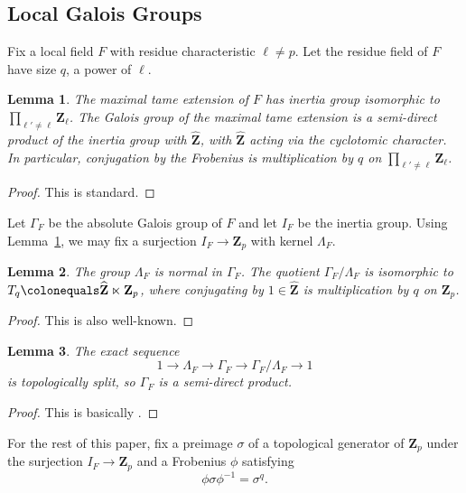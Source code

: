 \documentclass[11pt, letterpaper,english]{amsart}
\theoremstyle{plain}
\newtheorem{lem}{Lemma}
\newtheorem{lemma}[lem]{Lemma}
\theoremstyle{definition}
\numberwithin{equation}{section}
\numberwithin{lem}{section}
\newcommand{\mathfont}{\mathbf}
\newcommand{\Z}{\mathfont Z}
\newcommand{\ZZ}{\mathfont Z}
\newcommand{\Zhat}{\widehat{\ZZ}}
\newcommand{\Zp}{\mathfont{Z}_p}
\newcommand{\Ld}{\Lambda}
\begin{document}
\subsection{Local Galois Groups} \label{ss:galois}

Fix a local field $F$ with residue characteristic $\ell \neq p$.
Let the residue field of $F$ have size $q$, a power of $\ell$.

\begin{lemma} \label{lem:tamestructure}
The maximal tame extension of $F$ has inertia group isomorphic to $\prod_{\ell' \neq \ell} \ZZ_{\ell}$.
The Galois group of the maximal tame extension is a semi-direct product of the inertia group with $\Zhat$, with $\Zhat$ acting via the cyclotomic character.  In particular, conjugation by the Frobenius is multiplication by $q$ on $\prod_{\ell' \neq \ell} \ZZ_{\ell}$.
\end{lemma}

\begin{proof}
This is standard.  
\end{proof}

Let $\Gamma_F$ be the absolute Galois group of $F$ and let $I_F$ be the inertia group.  Using Lemma~\ref{lem:tamestructure}, we may fix a surjection $I_F \to \ZZ_p$ with kernel $\Lambda_F$.

\begin{lem} \label{lem:tq}
The group $\Lambda_F$ is normal in $\Gamma_F$.  The quotient $\Gamma_F / \Lambda_F$ is isomorphic to $T_q \colonequals \Zhat \ltimes \Z_p$, where conjugating by $1 \in \Zhat$ is multiplication by $q$ on $\Zp$.
\end{lem}

\begin{proof}
This is also well-known.
\end{proof}

\begin{lemma} \label{lem:semidirect prod}
The exact sequence
\[
1 \to \Ld_F \to \Gamma_F \to \Gamma_F / \Lambda_F \to 1
\]
is topologically split, so $\Gamma_F$ is a semi-direct product.
\end{lemma}

\begin{proof}
This is basically \cite[2.4.10]{cht08}. 
\end{proof}

For the rest of this paper, fix a preimage $\sigma$ of a topological generator of $\Z_p$ under the surjection $I_F \to \Z_p$ and a Frobenius $\phi$ satisfying  
\[ \phi \sigma \phi^{-1}=\sigma^q. \]
\end{document}
